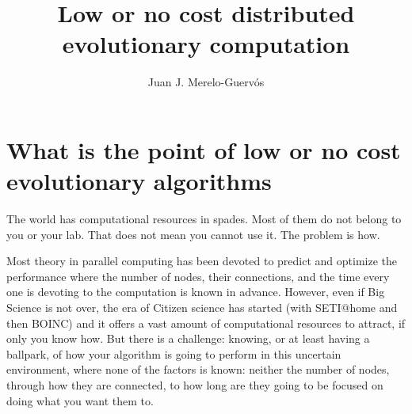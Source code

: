 \documentclass{svmult}
\begin{document}
\title*{Low or no cost distributed evolutionary computation}
\author{Juan J. Merelo-Guervós}


\maketitle


\section{What is the point of low or no cost evolutionary algorithms}

The world has computational resources in spades. Most of them do not belong to you or your lab. That does not mean you cannot use it. The problem is how.

Most theory in parallel computing has been devoted to predict and optimize the performance where the number of nodes, their connections, and the time every one is devoting to the computation is known in advance. However, even if Big Science is not over, the era of Citizen science has started (with SETI@home and then BOINC) and it offers a vast amount of computational resources to attract, if only you know how. But there is a challenge: knowing, or at least having a ballpark, of how your algorithm is going to perform in this uncertain environment, where none of the factors is known: neither the number of nodes, through how they are connected, to how long are they going to be focused on doing what you want them to.
\end{document}
